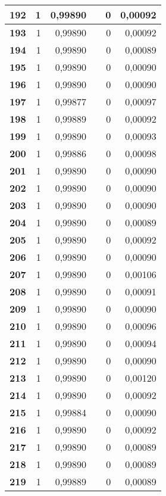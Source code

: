 \begin{longtable}{|r|r|r|l|r|r|}
\textbf{192} & 1 & 0,99890 &  & 0 & 0,00092 \\ \hline
\textbf{193} & 1 & 0,99890 &  & 0 & 0,00092 \\ \hline
\textbf{194} & 1 & 0,99890 &  & 0 & 0,00089 \\ \hline
\textbf{195} & 1 & 0,99890 &  & 0 & 0,00090 \\ \hline
\textbf{196} & 1 & 0,99890 &  & 0 & 0,00090 \\ \hline
\textbf{197} & 1 & 0,99877 &  & 0 & 0,00097 \\ \hline
\textbf{198} & 1 & 0,99889 &  & 0 & 0,00092 \\ \hline
\textbf{199} & 1 & 0,99890 &  & 0 & 0,00093 \\ \hline
\textbf{200} & 1 & 0,99886 &  & 0 & 0,00098 \\ \hline
\textbf{201} & 1 & 0,99890 &  & 0 & 0,00090 \\ \hline
\textbf{202} & 1 & 0,99890 &  & 0 & 0,00090 \\ \hline
\textbf{203} & 1 & 0,99890 &  & 0 & 0,00090 \\ \hline
\textbf{204} & 1 & 0,99890 &  & 0 & 0,00089 \\ \hline
\textbf{205} & 1 & 0,99890 &  & 0 & 0,00092 \\ \hline
\textbf{206} & 1 & 0,99890 &  & 0 & 0,00090 \\ \hline
\textbf{207} & 1 & 0,99890 &  & 0 & 0,00106 \\ \hline
\textbf{208} & 1 & 0,99890 &  & 0 & 0,00091 \\ \hline
\textbf{209} & 1 & 0,99890 &  & 0 & 0,00090 \\ \hline
\textbf{210} & 1 & 0,99890 &  & 0 & 0,00096 \\ \hline
\textbf{211} & 1 & 0,99890 &  & 0 & 0,00094 \\ \hline
\textbf{212} & 1 & 0,99890 &  & 0 & 0,00090 \\ \hline
\textbf{213} & 1 & 0,99890 &  & 0 & 0,00120 \\ \hline
\textbf{214} & 1 & 0,99890 &  & 0 & 0,00092 \\ \hline
\textbf{215} & 1 & 0,99884 &  & 0 & 0,00090 \\ \hline
\textbf{216} & 1 & 0,99890 &  & 0 & 0,00092 \\ \hline
\textbf{217} & 1 & 0,99890 &  & 0 & 0,00089 \\ \hline
\textbf{218} & 1 & 0,99890 &  & 0 & 0,00089 \\ \hline
\textbf{219} & 1 & 0,99889 &  & 0 & 0,00089 \\ \hline

\end{longtable}
